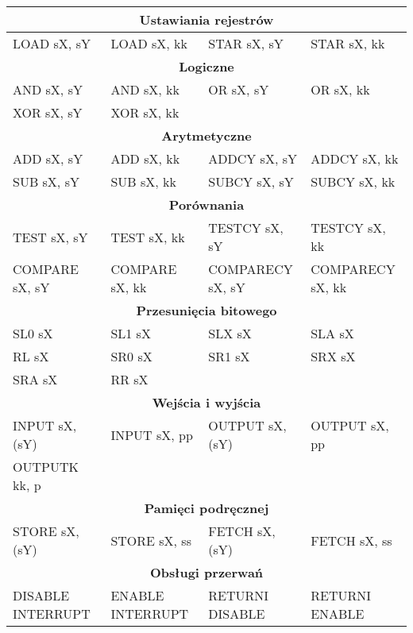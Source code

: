 	
\begin{table}[h]
	\begin{center}
		
		{\scriptsize 
			
		\begin{tabular}{|l|l|l|l|}
			\hline \multicolumn{4}{|c|}{ \textbf{Ustawiania rejestrów} } \\ \hline
			LOAD sX, sY &
			LOAD sX, kk &
			STAR sX, sY &
			STAR sX, kk \\
			
			\hline \multicolumn{4}{|c|}{ \textbf{Logiczne} } \\ \hline
			AND sX, sY &
			AND sX, kk &
			OR sX, sY &
			OR sX, kk \\
			XOR sX, sY &
			XOR sX, kk &&\\

			\hline \multicolumn{4}{|c|}{ \textbf{Arytmetyczne} } \\ \hline
ADD sX, sY&
ADD sX, kk&
ADDCY sX, sY&
ADDCY sX, kk\\
SUB sX, sY&
SUB sX, kk &
SUBCY sX, sY&
SUBCY sX, kk\\

			\hline \multicolumn{4}{|c|}{ \textbf{Porównania} } \\ \hline
TEST sX, sY&
TEST sX, kk&
TESTCY sX, sY&
TESTCY sX, kk\\
COMPARE sX, sY&
COMPARE sX, kk&
COMPARECY sX, sY&
COMPARECY sX, kk\\

			\hline \multicolumn{4}{|c|}{ \textbf{Przesunięcia bitowego} } \\ \hline
SL0 sX&
SL1 sX&
SLX sX&
SLA sX\\
RL sX&
SR0 sX&
SR1 sX&
SRX sX\\
SRA sX&
RR sX&&\\

			\hline \multicolumn{4}{|c|}{ \textbf{Wejścia i wyjścia} } \\ \hline
INPUT sX, (sY)&
INPUT sX, pp&
OUTPUT sX,(sY)&
OUTPUT sX, pp\\
OUTPUTK kk, p&&&\\

			\hline \multicolumn{4}{|c|}{ \textbf{Pamięci podręcznej} } \\ \hline
STORE sX,(sY)&
STORE sX, ss&
FETCH sX, (sY)&
FETCH sX, ss\\

			\hline \multicolumn{4}{|c|}{ \textbf{Obsługi przerwań} } \\ \hline
DISABLE INTERRUPT&
ENABLE INTERRUPT&
RETURNI DISABLE&
RETURNI ENABLE\\



\end{tabular}}
\end{center}
\end{table}
